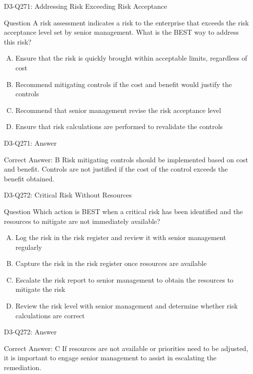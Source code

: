 \documentclass{beamer}
\begin{document}
	\begin{frame}{D3-Q271: Addressing Risk Exceeding Risk Acceptance}
		\begin{block}{Question}
			A risk assessment indicates a risk to the enterprise that exceeds the risk acceptance level set by senior management. What is the BEST way to address this risk?
		\end{block}
		\begin{enumerate}[(A)]
			\item Ensure that the risk is quickly brought within acceptable limits, regardless of cost
			\item Recommend mitigating controls if the cost and benefit would justify the controls
			\item Recommend that senior management revise the risk acceptance level
			\item Ensure that risk calculations are performed to revalidate the controls
		\end{enumerate}
	\end{frame}
	\begin{frame}{D3-Q271: Answer}
		\begin{block}{Correct Answer: B}
			Risk mitigating controls should be implemented based on cost and benefit. Controls are not justified if the cost of the control exceeds the benefit obtained.
		\end{block}
	\end{frame}
	
	\begin{frame}{D3-Q272: Critical Risk Without Resources}
		\begin{block}{Question}
			Which action is BEST when a critical risk has been identified and the resources to mitigate are not immediately available?
		\end{block}
		\begin{enumerate}[(A)]
			\item Log the risk in the risk register and review it with senior management regularly
			\item Capture the risk in the risk register once resources are available
			\item Escalate the risk report to senior management to obtain the resources to mitigate the risk
			\item Review the risk level with senior management and determine whether risk calculations are correct
		\end{enumerate}
	\end{frame}
	\begin{frame}{D3-Q272: Answer}
		\begin{block}{Correct Answer: C}
			If resources are not available or priorities need to be adjusted, it is important to engage senior management to assist in escalating the remediation.
		\end{block}
	\end{frame}
	
\end{document}
